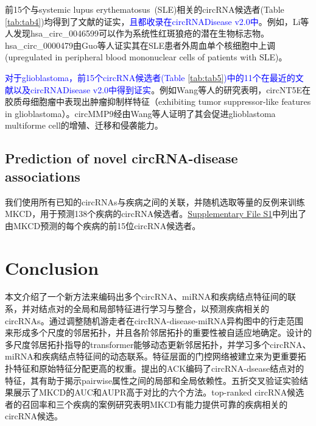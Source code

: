 \documentclass{bioinfo}
\begin{document}
\begin{methods}
前15个与systemic lupus erythematosus\ (SLE)相关的circRNA候选者(Table \ref{tab:tab4})均得到了文献的证实，\textcolor{blue}{且都收录在circRNADisease v2.0中}。例如，Li等人\cite{li2018comprehensive}发现hsa\_circ\_0046599可以作为系统性红斑狼疮的潜在生物标志物。hsa\_circ\_0000479由Guo等人\cite{guo2019hsa_circ_0000479}证实其在SLE患者外周血单个核细胞中上调(upregulated in peripheral blood mononuclear cells of patients with SLE)。

\textcolor{blue}{对于glioblastoma，前15个circRNA候选者(Table \ref{tab:tab5})中的11个在最近的文献以及circRNADisease v2.0中得到证实}。例如Wang等人\cite{wang2018circnt5e}的研究表明，circNT5E在胶质母细胞瘤中表现出肿瘤抑制样特征（exhibiting tumor suppressor-like features in glioblastoma）。circMMP9经由Wang等人\cite{wang2018eif4a3}证明了其会促进glioblastoma multiforme cell的增殖、迁移和侵袭能力。


\subsection{Prediction of novel circRNA-disease associations}
我们使用所有已知的circRNAs与疾病之间的关联，并随机选取等量的反例来训练MKCD，用于预测138个疾病的circRNA候选者。\href{path/to/S1.pdf}{Supplementary File S1}中列出了由MKCD预测的每个疾病的前15位circRNA候选者。


\section{Conclusion}
本文介绍了一个新方法来编码出多个circRNA、miRNA和疾病结点特征间的联系，并对结点对的全局和局部特征进行学习与整合，以预测疾病相关的circRNAs。通过调整随机游走者在circRNA-disease-miRNA异构图中的行走范围来形成多个尺度的邻居拓扑，并且各阶邻居拓扑的重要性被自适应地确定。设计的多尺度邻居拓扑指导的transformer能够动态更新邻居拓扑，并学习多个circRNA、miRNA和疾病结点特征间的动态联系。特征层面的门控网络被建立来为更重要拓扑特征和原始特征分配更高的权重。提出的ACK编码了circRNA-dsease结点对的特征，其有助于揭示pairwise属性之间的局部和全局依赖性。五折交叉验证实验结果展示了MKCD的AUC和AUPR高于对比的六个方法。top-ranked circRNA候选者的召回率和三个疾病的案例研究表明MKCD有能力提供可靠的疾病相关的circRNA候选。




\end{methods}
\end{document}
